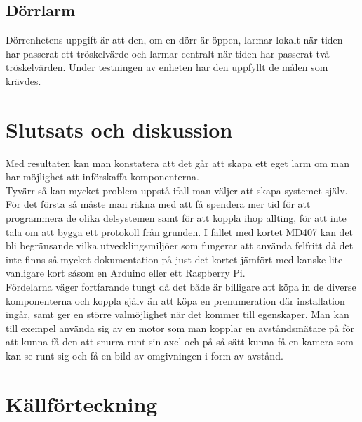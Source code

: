 \documentclass{article}
\begin{document}
\subsection{Dörrlarm}
Dörrenhetens uppgift är att den, om en dörr är öppen, larmar lokalt när tiden har passerat ett tröskelvärde och larmar centralt när tiden har passerat två tröskelvärden. Under testningen av enheten har den uppfyllt de målen som krävdes.


\section{Slutsats och diskussion}
Med resultaten kan man konstatera att det går att skapa ett eget larm om man har möjlighet att införskaffa komponenterna.\\

Tyvärr så kan mycket problem uppstå ifall man väljer att skapa systemet själv.
För det första så måste man räkna med att få spendera mer tid för att programmera de olika delsystemen samt för att koppla ihop allting, för att inte tala om att bygga ett protokoll från grunden.
I fallet med kortet MD407 kan det bli begränsande vilka utvecklingsmiljöer som fungerar att använda felfritt då det inte finns så mycket dokumentation på just det kortet jämfört med kanske lite vanligare kort såsom en Arduino eller ett Raspberry Pi.\\

Fördelarna väger fortfarande tungt då det både är billigare att köpa in de diverse komponenterna och koppla själv än att köpa en prenumeration där installation ingår, 
samt ger en större valmöjlighet när det kommer till egenskaper. 
Man kan till exempel använda sig av en motor som man kopplar en avståndsmätare på för att kunna få den att snurra runt sin axel och på så sätt kunna få en kamera som kan se runt sig och få en bild av omgivningen i form av avstånd.

\newpage
\section{Källförteckning}
\printbibliography[heading=none]
\end{document}
